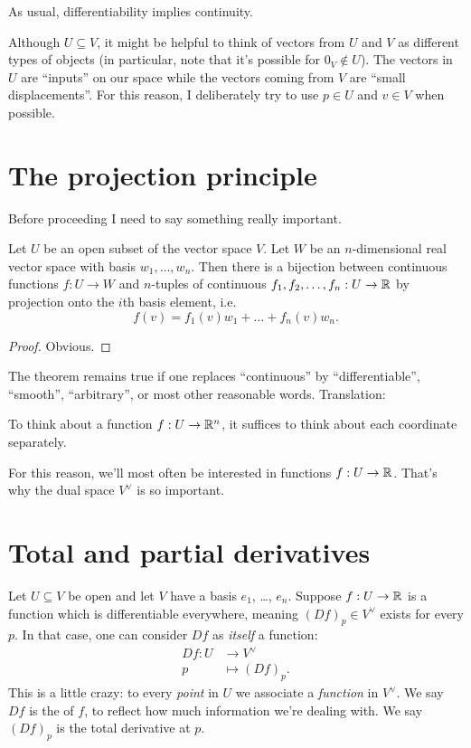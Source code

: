 \begin{remark}
	As usual, differentiability implies continuity.
\end{remark}
\begin{remark}
	Although $U \subseteq V$, it might be helpful to think of vectors from $U$ and $V$
	as different types of objects (in particular, note that it's possible for $0_V \notin U$).
	The vectors in $U$ are ``inputs'' on our space
	while the vectors coming from $V$ are ``small displacements''.
	For this reason, I deliberately try to use $p \in U$ and $v \in V$ when possible.
\end{remark}

\section{The projection principle}
Before proceeding I need to say something really important.
\begin{theorem}
	\label{thm:project_principle}
	Let $U$ be an open subset of the vector space $V$.
	Let $W$ be an $n$-dimensional real vector space with basis $w_1, \dots, w_n$.
	Then there is a bijection between continuous functions $f : U \to W$ and
	$n$-tuples of continuous $f_1, f_2, \dots, f_n : U \to \mathbb R$
	by projection onto the $i$th basis element, i.e.\ 
	\[ f(v) = f_1(v)w_1 + \dots + f_n(v)w_n. \]
\end{theorem}
\begin{proof}
	Obvious.
\end{proof}
The theorem remains true if one replaces ``continuous'' by ``differentiable'', ``smooth'', ``arbitrary'',
or most other reasonable words. Translation:
\begin{moral}
To think about a function $f : U \to \mathbb R^{n}$,
it suffices to think about each coordinate separately.
\end{moral}
For this reason, we'll most often be interested in functions $f : U \to \mathbb R$.
That's why the dual space $V^\vee$ is so important.

\section{Total and partial derivatives}
\prototype{If $f(x,y) = x^2+y^2$, then
$(Df) : (x,y) \mapsto 2x \cdot \ee_1^\vee + 2y \cdot \ee_2^\vee$, and
$\fpartial fx = 2x$, $\fpartial fy = 2y$.}
Let $U \subseteq V$ be open and let $V$ have a basis $e_1$, \dots, $e_n$.
Suppose $f : U \to \mathbb R$ is a function which is differentiable everywhere,
meaning $(Df)_p \in V^\vee$ exists for every $p$.
In that case, one can consider $Df$ as \emph{itself} a function:
\begin{align*}
	Df : U &\to V^\vee \\
	p &\mapsto (Df)_p.
\end{align*}
This is a little crazy: to every \emph{point} in $U$
we associate a \emph{function} in $V^\vee$.
We say $Df$ is the  of $f$,
to reflect how much information we're dealing with.
We say $(Df)_p$ is the total derivative at $p$.

